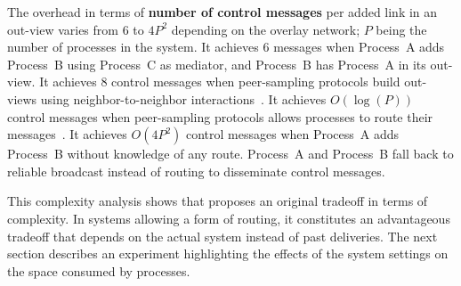 \noindent The overhead in terms of \textbf{number of control messages} per added
link in an out-view varies from $6$ to $4P^2$ depending on the overlay network;
$P$ being the number of processes in the system. It achieves $6$ messages when
Process~A adds Process~B using Process~C as mediator, and Process~B has
Process~A in its out-view.  It achieves $8$ control messages when peer-sampling
protocols build out-views using neighbor-to-neighbor
interactions~\cite{jelasity2007gossip,nedelec2017adaptive}. It achieves
$O(\log(P))$ control messages when peer-sampling protocols allows processes to
route their messages~\cite{jelasity2009tman,stoica2001chord}.  It achieves
$O(4P^2)$ control messages when Process~A adds Process~B without knowledge of
any route. Process~A and Process~B fall back to reliable broadcast instead of
routing to disseminate control messages.

This complexity analysis shows that \RPCBROADCAST proposes an original tradeoff
in terms of complexity. In systems allowing a form of routing, it constitutes an
advantageous tradeoff that depends on the actual system instead of past
deliveries. The next section describes an experiment highlighting the effects of
the system settings on the space consumed by processes.

